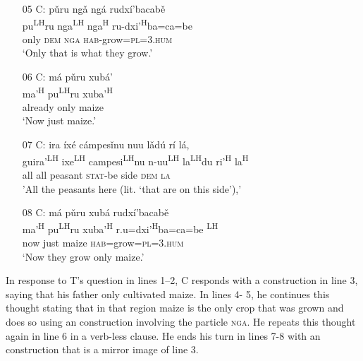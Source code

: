\begin{itemize}
\item[05 C:] 
\glll p\v{u}ru ng\v{a} ng\'{a} rudx\'{i}'bacab\v{e} \\
pu\textsuperscript{LH}ru nga\textsuperscript{LH} nga\textsuperscript{H} ru-dxi'\textsuperscript{H}ba=ca=be \\
only \textsc{dem} \textsc{nga} \textsc{hab}-grow=\textsc{pl=3.hum} \\
\glt `Only that is what they grow.' 


\item[06 C:]
\glll m\'{a} p\v{u}ru xub\'{a}'  \\
ma'\textsuperscript{H} pu\textsuperscript{LH}ru xuba'\textsuperscript{H}   \\
already only maize \\
\glt `Now just maize.'  


\item[07 C:] 
\glll ira \'{i}x\'{e} c\'{a}mpes\v{i}nu nuu l\v{a}d\'{u} r\'{i} l\'{a}, \\
guira'\textsuperscript{LH} ixe\textsuperscript{LH} campesi\textsuperscript{LH}nu n-uu\textsuperscript{LH} la\textsuperscript{LH}du ri'\textsuperscript{H}  la\textsuperscript{H} \\
all all peasant \textsc{stat}-be side \textsc{dem} \textsc{la} \\
\glt 'All the peasants here (lit. `that are on this side'),'


\item[08 C:]
\glll m\'{a} p\v{u}ru xub\'{a} rudx\'{i}'bacab\v{e}  \\        
ma'\textsuperscript{H} pu\textsuperscript{LH}ru xuba'\textsuperscript{H} r.u=dxi'\textsuperscript{H}ba=ca=be \textsuperscript{LH}  \\
now just maize \textsc{hab}=grow=\textsc{pl=3.hum}  \\
\glt `Now they grow only maize.' 

\end{itemize}
\z

In response to T's question in lines 1--2, C responds with a  construction in line 3, saying that his father only cultivated maize. In lines 4- 5, he continues this thought stating that in that region maize is the only crop that was grown and does so using an  construction involving the particle \textsc{nga}. He repeats this thought again in line 6 in a verb-less clause. He ends his turn in lines 7-8 with an  construction that is a mirror image of line 3. 

